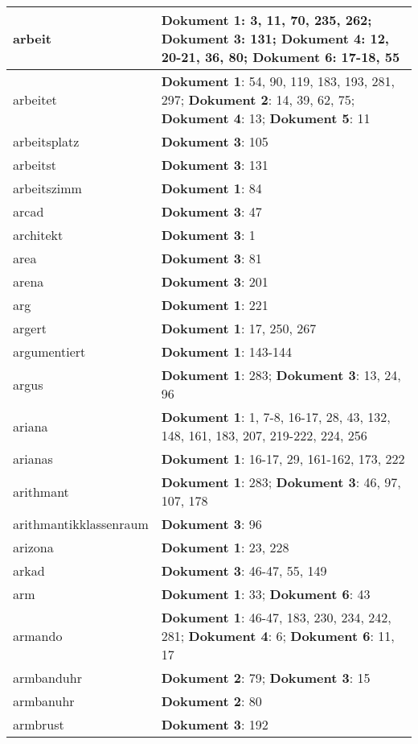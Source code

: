 \documentclass[a5paper]{article}
\begin{document}
\begin{longtable}[l]{|l|p{3in}|}
\hline
arbeit & \textbf{Dokument 1}: 3, 11, 70, 235, 262; \textbf{Dokument 3}: 131; \textbf{Dokument 4}: 12, 20-21, 36, 80; \textbf{Dokument 6}: 17-18, 55 \\
\hline
arbeitet & \textbf{Dokument 1}: 54, 90, 119, 183, 193, 281, 297; \textbf{Dokument 2}: 14, 39, 62, 75; \textbf{Dokument 4}: 13; \textbf{Dokument 5}: 11 \\
\hline
arbeitsplatz & \textbf{Dokument 3}: 105 \\
\hline
arbeitst & \textbf{Dokument 3}: 131 \\
\hline
arbeitszimm & \textbf{Dokument 1}: 84 \\
\hline
arcad & \textbf{Dokument 3}: 47 \\
\hline
architekt & \textbf{Dokument 3}: 1 \\
\hline
area & \textbf{Dokument 3}: 81 \\
\hline
arena & \textbf{Dokument 3}: 201 \\
\hline
arg & \textbf{Dokument 1}: 221 \\
\hline
argert & \textbf{Dokument 1}: 17, 250, 267 \\
\hline
argumentiert & \textbf{Dokument 1}: 143-144 \\
\hline
argus & \textbf{Dokument 1}: 283; \textbf{Dokument 3}: 13, 24, 96 \\
\hline
ariana & \textbf{Dokument 1}: 1, 7-8, 16-17, 28, 43, 132, 148, 161, 183, 207, 219-222, 224, 256 \\
\hline
arianas & \textbf{Dokument 1}: 16-17, 29, 161-162, 173, 222 \\
\hline
arithmant & \textbf{Dokument 1}: 283; \textbf{Dokument 3}: 46, 97, 107, 178 \\
\hline
arithmantikklassenraum & \textbf{Dokument 3}: 96 \\
\hline
arizona & \textbf{Dokument 1}: 23, 228 \\
\hline
arkad & \textbf{Dokument 3}: 46-47, 55, 149 \\
\hline
arm & \textbf{Dokument 1}: 33; \textbf{Dokument 6}: 43 \\
\hline
armando & \textbf{Dokument 1}: 46-47, 183, 230, 234, 242, 281; \textbf{Dokument 4}: 6; \textbf{Dokument 6}: 11, 17 \\
\hline
armbanduhr & \textbf{Dokument 2}: 79; \textbf{Dokument 3}: 15 \\
\hline
armbanuhr & \textbf{Dokument 2}: 80 \\
\hline
armbrust & \textbf{Dokument 3}: 192 \\
\hline

\end{longtable}
\end{document}
